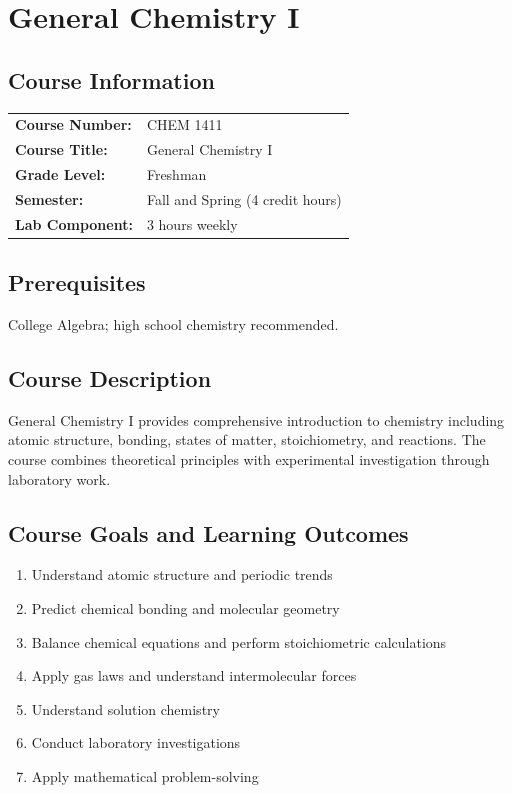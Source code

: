 \documentclass[12pt,oneside]{book}
\begin{document}
\chapter{General Chemistry I}

\section{Course Information}

\begin{tabular}{ll}
\textbf{Course Number:} & CHEM 1411 \\
\textbf{Course Title:} & General Chemistry I \\
\textbf{Grade Level:} & Freshman \\
\textbf{Semester:} & Fall and Spring (4 credit hours) \\
\textbf{Lab Component:} & 3 hours weekly \\
\end{tabular}

\section{Prerequisites}

College Algebra; high school chemistry recommended.

\section{Course Description}

General Chemistry I provides comprehensive introduction to chemistry including atomic structure, bonding, states of matter, stoichiometry, and reactions. The course combines theoretical principles with experimental investigation through laboratory work.

\section{Course Goals and Learning Outcomes}

\begin{enumerate}
    \item Understand atomic structure and periodic trends
    \item Predict chemical bonding and molecular geometry
    \item Balance chemical equations and perform stoichiometric calculations
    \item Apply gas laws and understand intermolecular forces
    \item Understand solution chemistry
    \item Conduct laboratory investigations
    \item Apply mathematical problem-solving
\end{enumerate}
\end{document}
